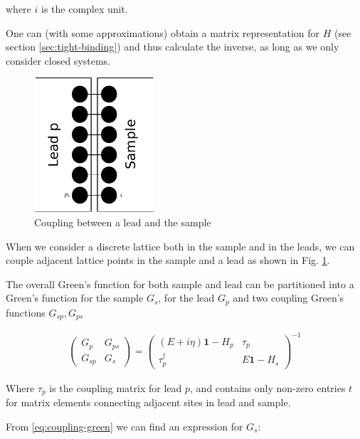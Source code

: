 \documentclass[11pt,twoside]{book}
\begin{document}
where $i$ is the complex unit.

One can (with some approximations) obtain a matrix representation for $H$
(see section \ref{sec:tight-binding}) and thus calculate the inverse, as
long as we only consider closed systems.

\begin{figure}
    \begin{center}
        \includegraphics[height=5cm]{coupling-sample-lead}
    \end{center}
    \caption{Coupling between a lead and the sample}
    \label{fig:coupling-sample-lead}
\end{figure}

When we consider a discrete lattice both in the sample and in the leads, we
can couple adjacent lattice points in the sample and a lead as shown in Fig.
\ref{fig:coupling-sample-lead}.

The overall Green's function for both sample and lead can be partitioned into
a Green's function for the sample $G_s$, for the lead $G_p$ and two coupling
Green's functions $G_{sp}, G_{ps}$

\begin{align}
\left(
    \begin{array}{ll}
        G_p    & G_{ps}\\
        G_{sp} & G_s
    \end{array}
\right)
=
\left(
    \begin{array}{ll}
        (E + i\eta)\mathbf{1} - H_p   & \tau_p\\
        \tau_p^\dagger                & E\mathbf{1} - H_s
    \end{array}
\right)^{-1}
\label{eq:coupling-green}
\end{align}

Where $\tau_p$ is the coupling matrix for lead $p$, and contains only non-zero
entries $t$ for matrix elements connecting adjacent sites in lead and sample.

From \ref{eq:coupling-green} we can find an expression for $G_s$:
\end{document}
